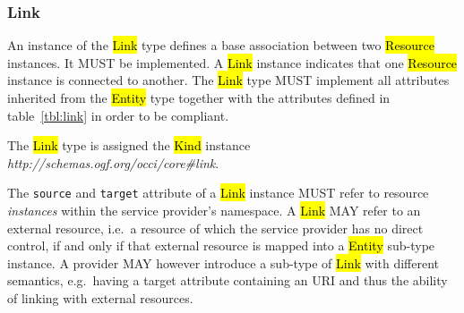 \documentclass[10pt,a4paper]{article}
\begin{document}
\subsubsection{Link}
\label{sec:link}
An instance of the \hl{Link} type defines a base association between two
\hl{Resource} instances. It MUST be implemented. A \hl{Link} instance indicates
that one \hl{Resource} instance is connected to another.
%
The \hl{Link} type MUST implement all attributes inherited from the
\hl{Entity} type together with the attributes defined in table~\ref{tbl:link}
in order to be compliant.
%

The \hl{Link} type is assigned the \hl{Kind} instance
\textit{http://schemas.ogf.org/occi/core\#link}.
%

The {\tt source} and {\tt target} attribute of a \hl{Link} instance MUST refer
to resource {\em instances} within the service provider's namespace. A
\hl{Link} MAY refer to an external resource, i.e.~a resource of which the
service provider has no direct control, if and only if that external resource
is mapped into a \hl{Entity} sub-type instance.
%
A provider MAY however introduce a sub-type of \hl{Link} with different
semantics, e.g.~having a target attribute containing an URI and thus the
ability of linking with external resources.
\end{document}
